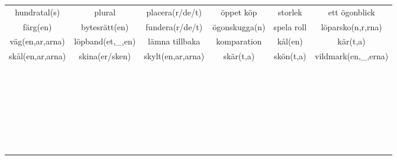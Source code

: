 \begin{center}
\begin{adjustwidth}{-2cm}{}
\begin{tabular}{|c c c c c c|}
            hundratal(s) & plural & placera(r/de/t) & öppet köp & storlek & ett ögonblick \\
            färg(en) & bytesrätt(en) & fundera(r/de/t) & ögonskugga(n) & spela roll & löparsko(n,r,rna) \\
            väg(en,ar,arna) & löpband(et,\_,en) & lämna tillbaka & komparation & kål(en) & kär(t,a) \\
            skål(en,ar,arna) & skina(er/sken) & skylt(en,ar,arna) & skär(t,a) & skön(t,a) & vildmark(en,\_,erna) \\
             &  &  &  &  &  \\
             &  &  &  &  &  \\
             &  &  &  &  &  \\
             &  &  &  &  &  \\
             &  &  &  &  &  \\
             &  &  &  &  &  \\
             &  &  &  &  &  \\
             &  &  &  &  &  \\
             &  &  &  &  &  \\
             &  &  &  &  &  \\
             &  &  &  &  &  \\
             &  &  &  &  &  \\
             &  &  &  &  &  \\
             &  &  &  &  &  \\
             &  &  &  &  &  \\
             &  &  &  &  &  \\
             &  &  &  &  &  \\
             &  &  &  &  &  \\
             &  &  &  &  &  \\
             &  &  &  &  &  \\
             &  &  &  &  &  \\
             &  &  &  &  &  \\
             &  &  &  &  &  \\
             &  &  &  &  &  \\
             &  &  &  &  &  \\
             &  &  &  &  &  \\
             &  &  &  &  &  \\
             &  &  &  &  &  \\
             &  &  &  &  &  \\

\end{tabular}
\end{adjustwidth}
\end{center}
